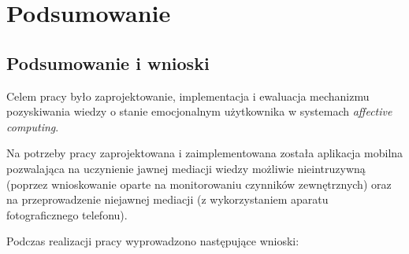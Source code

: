 \chapter{Podsumowanie}
\label{cha:podsumowanie}



\section{Podsumowanie i wnioski}
\label{sec:podsumowanieIWnioski}

Celem pracy było zaprojektowanie, implementacja i ewaluacja mechanizmu pozyskiwania wiedzy o  stanie emocjonalnym użytkownika w systemach \textit{affective computing}.  

Na potrzeby pracy zaprojektowana i zaimplementowana została aplikacja mobilna pozwalająca na uczynienie jawnej mediacji wiedzy możliwie nieintruzywną (poprzez wnioskowanie oparte na monitorowaniu czynników zewnętrznych) oraz na przeprowadzenie niejawnej mediacji (z wykorzystaniem aparatu fotograficznego telefonu). 

Podczas realizacji pracy wyprowadzono następujące wnioski:

